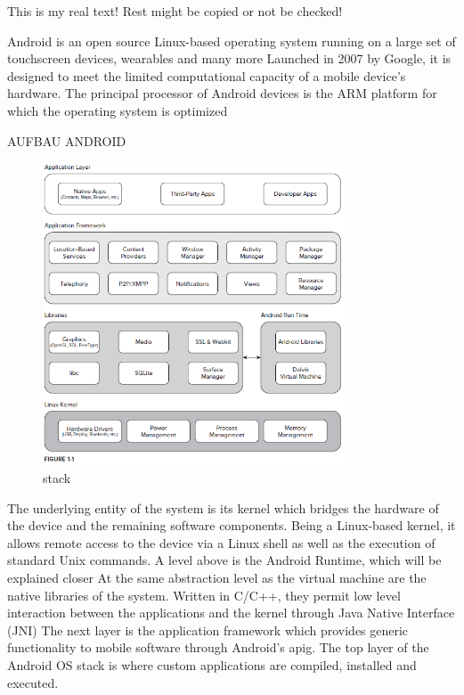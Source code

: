 This is my real text! Rest might be copied or not be checked!

%
Android is an open source Linux-based operating system running on a large set of touchscreen devices, wearables and many more\newline
Launched in 2007 by Google, it is designed to meet the limited computational capacity of a mobile device’s hardware. The principal processor of Android devices is the ARM platform for which the operating system is optimized\newline

AUFBAU ANDROID
\begin{figure}[h]
    \centering
    \includegraphics[width=0.8\textwidth]{data/stack.png}
    \caption{stack}
    \label{fig:stack}
\end{figure}
The underlying entity of the system is its kernel which bridges the hardware of the device and the remaining software components. Being a Linux-based kernel, it allows remote access to the device via a Linux shell as well as the execution of standard Unix commands.\newline
A level above is the Android Runtime, which will be explained closer\newline
At the same abstraction level as the virtual machine are the native libraries of the system. Written in C/C++, they permit low level interaction between the applications and the kernel through Java Native Interface (JNI)\newline
The next layer is the application framework which provides generic functionality to mobile software through Android’s  \gls{apig}.
The top layer of the Android OS stack is where custom applications are compiled, installed and executed.\newline
\cite{kovachevaMaster}
%


